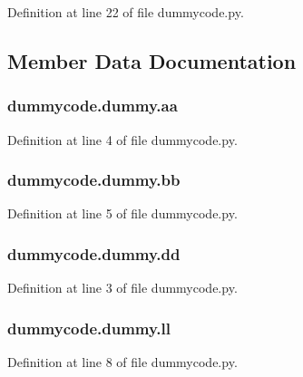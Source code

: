 Definition at line 22 of file dummycode.\-py.



\subsection{Member Data Documentation}
\subsubsection[{aa}]{\setlength{\rightskip}{0pt plus 5cm}dummycode.\-dummy.\-aa}\label{classdummycode_1_1dummy_ade8c2a23728fea407400de565af9d924}


Definition at line 4 of file dummycode.\-py.

\subsubsection[{bb}]{\setlength{\rightskip}{0pt plus 5cm}dummycode.\-dummy.\-bb}\label{classdummycode_1_1dummy_a8fc4a473d7dc65b38abc8ca2bbf56d0c}


Definition at line 5 of file dummycode.\-py.

\subsubsection[{dd}]{\setlength{\rightskip}{0pt plus 5cm}dummycode.\-dummy.\-dd}\label{classdummycode_1_1dummy_af2feb69e325549343d505d0f5afaacd0}


Definition at line 3 of file dummycode.\-py.

\subsubsection[{ll}]{\setlength{\rightskip}{0pt plus 5cm}dummycode.\-dummy.\-ll}\label{classdummycode_1_1dummy_aff4159330a4c573597b401b5503818d7}


Definition at line 8 of file dummycode.\-py.

